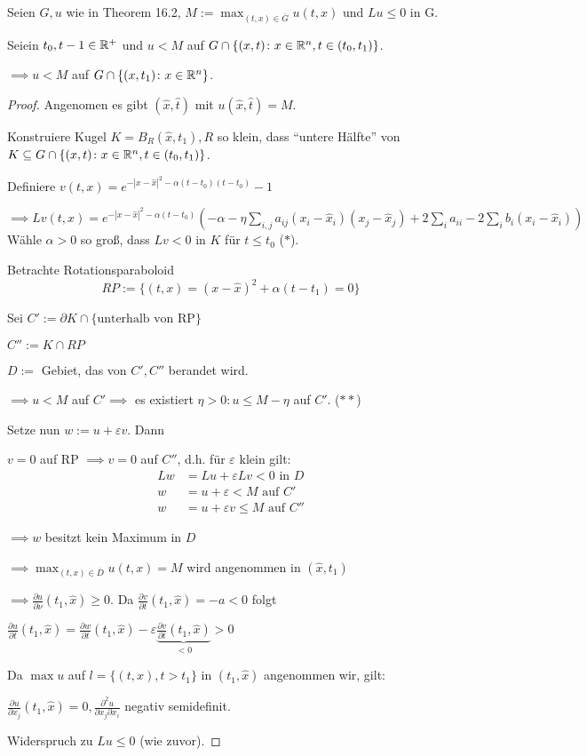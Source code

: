 Seien $G, u$ wie in Theorem 16.2, $M := \max_{(t,x) \in \overline G} u(t,x)$ und $L u \leq 0$ in G.

Seiein $t_0, t-1 \in \mathbb{R}^+$ und $u < M$ auf $G \cap \{(x,t) \colon x \in \mathbb{R}^n, t \in (t_0, t_1) \}$.

$\implies u < M$ auf $G \cap \{(x, t_1) \colon x \in \mathbb{R}^n\}$.

\begin{proof}
  Angenomen es gibt $(\hat x, \hat t)$ mit $u(\hat x, \hat t) = M$.

  Konstruiere Kugel $K = B_R(\hat x, t_1), R$ so klein, dass ``untere Hälfte'' von $K \subseteq G \cap \{(x,t) \colon x \in \mathbb{R}^n, t \in (t_0, t_1)\}$.

  Definiere $v(t,x) = e^{-|x - \hat x|^2 - \alpha(t - t_0)(t - t_0)} - 1$

  $\implies Lv(t,x) = e^{-|x - \hat x|^2 - \alpha(t - t_0)}(-\alpha - \eta \sum_{i,j} a_{ij}(x_i - \hat x_i)(x_j - \hat x_j) + 2 \sum_i a_{ii} - 2\sum_i b_i(x_i - \hat x_i))$
   Wähle $\alpha > 0$ so groß, dass $Lv < 0$ in $K$ für $t \leq t_0$ ($\ast$).

   Betrachte Rotationsparaboloid
   $$
   RP := \{(t,x) = (x - \hat x)^2 + \alpha (t - t_1) = 0\}
   $$

   Sei $C' := \partial K \cap \{ \text{unterhalb von RP}\} $

   $C'' := K \cap RP$

   $D := $ Gebiet, das von $C', C''$ berandet wird.

   $\implies u < M$ auf $C' \implies $ es existiert $\eta > 0 \colon u \leq M - \eta$ auf $C'$. ($\ast\ast$)

   Setze nun $w:= u + \varepsilon v$. Dann

   $v = 0$ auf RP $\implies  v = 0$ auf $C''$, d.h. für $\varepsilon$ klein gilt:
   \begin{align*}
     Lw &= Lu + \varepsilon Lv < 0 \text{ in } D \\
     w &= u + \varepsilon < M \text{ auf } C' \\
     w &= u + \varepsilon v \leq M \text{ auf } C''
   \end{align*}

   $\implies w$ besitzt kein Maximum in $D$

   $\implies \max_{(t,x) \in \overline D} u(t,x) = M$ wird angenommen in $(\hat x, t_1)$

   $\implies \frac{\partial u}{\partial \nu} (t_1, \hat x) \geq 0$. Da $\frac{\partial v}{\partial t}(t_1, \hat x) = -a < 0$ folgt

   $\frac{\partial u}{\partial t}(t_1, \hat x) = \frac{\partial w}{\partial t}(t_1, \hat x) - \varepsilon \underbrace{\frac{\partial v}{\partial t}(t_1, \hat x)}_{< 0} > 0$

   Da $\max u$ auf $l = \{(t,x), t > t_1\}$ in $(t_1, \hat x)$ angenommen wir, gilt:

   $\frac{\partial u}{\partial x_j}(t_1, \hat x) = 0, \frac{\partial^2 u}{\partial x_j \partial x_i}$ negativ semidefinit.

   Widerspruch zu $Lu \leq 0$ (wie zuvor).
 \end{proof}

